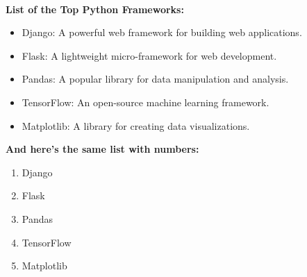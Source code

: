 \textbf{\\List of the Top Python Frameworks:}

\begin{itemize}
  \item Django: A powerful web framework for building web applications.
  \item Flask: A lightweight micro-framework for web development.
  \item Pandas: A popular library for data manipulation and analysis.
  \item TensorFlow: An open-source machine learning framework.
  \item Matplotlib: A library for creating data visualizations.
\end{itemize}

\textbf{And here's the same list with numbers:}

\begin{enumerate}
  \item Django
  \item Flask
  \item Pandas
  \item TensorFlow
  \item Matplotlib
\end{enumerate}